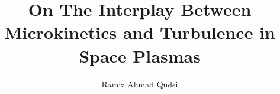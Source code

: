 %
%
\title[Title]{On The Interplay Between Microkinetics and Turbulence in Space Plasmas}
\author{Ramiz Ahmad Qudsi}
\majorfieldtrue{}
\subject{Subject}

\maketitlepage %

\newpage\null\thispagestyle{empty}\newpage





\begin{front} %

\newpage\null\thispagestyle{empty}\newpage





\maketocloflot



\end{front}